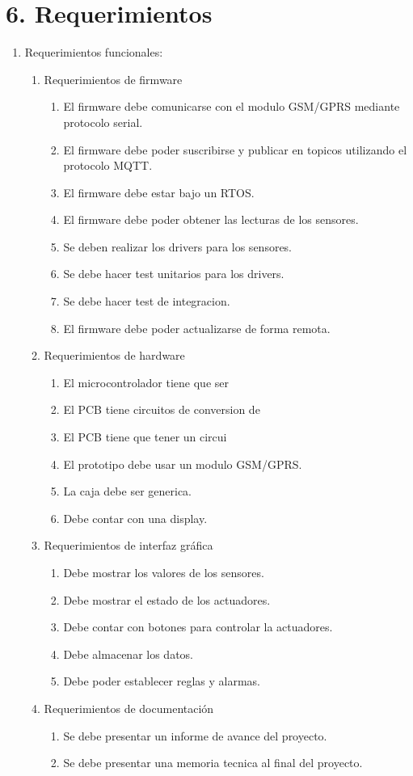 \documentclass[
11pt, %
codirector, %
]{charter}
\begin{document}
\section{6. Requerimientos}
\label{sec:requerimientos}
\begin{enumerate}
	\item Requerimientos funcionales:
		\begin{enumerate}
			\item Requerimientos de firmware
			\begin{enumerate} 
				\item El firmware debe comunicarse con el modulo GSM/GPRS mediante protocolo serial.
				\item El firmware debe poder suscribirse y publicar en topicos utilizando el protocolo MQTT.
				\item El firmware debe estar bajo un RTOS.
				\item El firmware debe poder obtener las lecturas de los sensores.
				\item Se deben realizar los drivers para los sensores.
				\item Se debe hacer test unitarios para los drivers.
				\item Se debe hacer test de integracion.
				\item El firmware debe poder actualizarse de forma remota.
			\end{enumerate}
			\item Requerimientos de hardware
			\begin{enumerate} 
				\item El microcontrolador tiene que ser 
				\item El PCB tiene circuitos de conversion de 
				\item El PCB tiene que tener un circui
				\item El prototipo debe usar un modulo GSM/GPRS.
				\item La caja debe ser generica.
				\item Debe contar con una display.
			\end{enumerate}			
			\item Requerimientos de interfaz gráfica
			\begin{enumerate} 
				\item Debe mostrar los valores de los sensores.
				\item Debe mostrar el estado de los actuadores.
				\item Debe contar con botones para controlar la actuadores.
				\item Debe almacenar los datos.
				\item Debe poder establecer reglas y alarmas. 
			\end{enumerate}
			\item Requerimientos de documentación
			\begin{enumerate} 
				\item Se debe presentar un informe de avance del proyecto.
				\item Se debe presentar una memoria tecnica al final del proyecto.
			\end{enumerate}
		\end{enumerate}


\end{enumerate}
\end{document}
